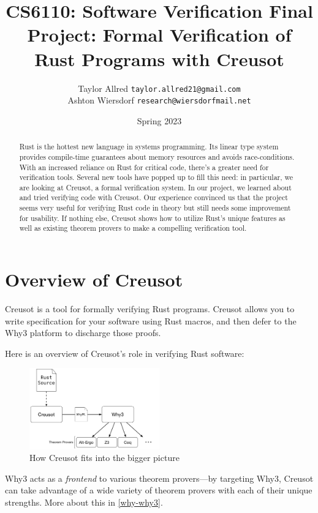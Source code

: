 \documentclass[12pt]{article}
\title{CS6110: Software Verification Final Project: Formal Verification of Rust Programs with Creusot}
\author{Taylor Allred \texttt{taylor.allred21@gmail.com}\\ Ashton Wiersdorf \texttt{research@wiersdorfmail.net}}
\date{Spring 2023}
\begin{document}
\maketitle

\begin{abstract}
\noindent
Rust is the hottest new language in systems programming.
Its linear type system provides compile-time guarantees about memory resources and avoids race-conditions.
With an increased reliance on Rust for critical code, there's a greater need for verification tools.
Several new tools have popped up to fill this need: in particular, we are looking at Creusot, a formal verification system.
In our project, we learned about and tried verifying code with Creusot.
Our experience convinced us that the project seems very useful for verifying Rust code in theory but still needs some improvement for usability. 
If nothing else, Creusot shows how to utilize Rust's unique features as well as existing theorem provers to make a compelling verification tool. 
\end{abstract}

\setcounter{tocdepth}{2}
\tableofcontents

\section{Overview of Creusot}

Creusot\cite{denisCreusot2023} is a tool for formally verifying Rust programs.
Creusot allows you to write specification for your software using Rust macros, and then defer to the Why3\cite{bobotWhy3ShepherdYour} platform to discharge those proofs.

Here is an overview of Creusot's role in verifying Rust software:

\begin{figure}[h]
  \centering
\includegraphics[width=0.5\textwidth]{creusot_why3_diagram}
\caption{How Creusot fits into the bigger picture}
\end{figure}

Why3 acts as a \emph{frontend} to various theorem provers---by targeting Why3, Creusot can take advantage of a wide variety of theorem provers with each of their unique strengths.
More about this in \ref{why-why3}.
\end{document}
